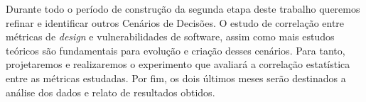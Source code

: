 %

Durante todo o período de construção da segunda etapa deste trabalho queremos refinar e identificar outros Cenários de Decisões. O estudo de correlação entre métricas de \emph{design} e vulnerabilidades de software, assim como mais estudos teóricos são fundamentais para evolução e criação desses cenários. Para tanto, projetaremos e realizaremos o experimento que avaliará a correlação estatística entre as métricas estudadas. Por fim, os dois últimos meses serão destinados a análise dos dados e relato de resultados obtidos. 

